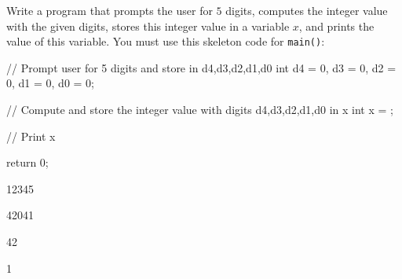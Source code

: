 Write a program that prompts the user for $5$ digits, computes the integer value with the given digits, stores this integer value in a variable $x$, and prints the value of this variable. You must use this skeleton code for \verb!main()!:

\begin{console}[commandchars=\\\{\}]
// Prompt user for 5 digits and store in d4,d3,d2,d1,d0
int d4 = 0, d3 = 0, d2 = 0, d1 = 0, d0 = 0;


// Compute and store the integer value with digits d4,d3,d2,d1,d0 in x
int x = \underline{                                                     };


// Print x

return 0;
\end{console}

\resett
\nextt
\begin{console}[commandchars=\\\{\}]
12345
\end{console}

\nextt
\begin{console}[commandchars=\\\{\}]
42041
\end{console}

\nextt
\begin{console}[commandchars=\\\{\}]
42
\end{console}

\nextt
\begin{console}[commandchars=\\\{\}]
1
\end{console}
